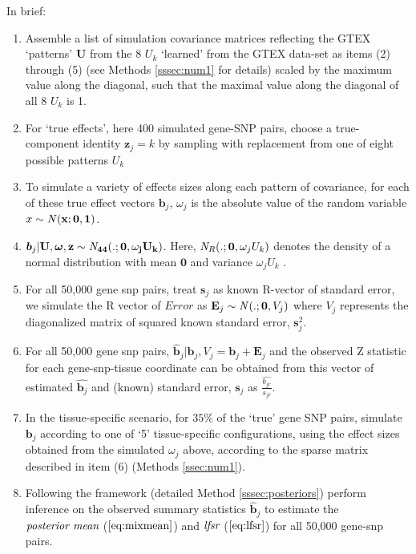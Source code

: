 In brief:
\begin{enumerate}
\item Assemble a list of simulation covariance matrices reflecting the GTEX `patterns' $\bm{U}$ from the 8 $U_{k}$ `learned' from the GTEX data-set as items (2) through (5) (see Methods \ref{sssec:num1} for details)  scaled by the maximum value along the diagonal, such that the maximal value along the diagonal of all 8 $U_{k}$ is 1.
\item For `true effects', here 400 simulated gene-SNP pairs, choose a true-component identity $\bm{z}_{j}=k$ by sampling with replacement from one of eight possible patterns $U_{k}$ 
\item To simulate a variety of effects sizes along each pattern of covariance, for each of these true effect vectors $\bm{b}_{j}$, $\omega_{j}$ is the absolute value of  the random variable $x \sim {\it N}(\bf{x}; \bm{0}, 1)$.
\item $ \bm{b}_{j}  | \bf{U}, \bm{\omega}, \bm{z} \sim{\it N}_{44} (.; \bm{0}, \omega_j U_{k})$. Here, ${\it N}_R(.; \bm{0}, \omega_j U_{k})$ denotes the density of a normal distribution with mean $\bm{0}$ and variance $\omega_j U_{k}$ .

\item For all 50,000 gene snp pairs, treat $\bm{s}_{j}$ as known R-vector of standard error, we simulate the R vector of $Error$ as $\textbf{E}_{j} \sim {\it N} (.; \bm{0}, V_{j} )$ where $V_{j} $ represents the diagonalized matrix of squared known standard error, $\bm{s}_{j}^{2}$. 
\item For all 50,000 gene snp pairs, $\hat{\bm{b}}_{j} | \bm{b}_{j} , V_{j} = \bm{b}_{j} + \textbf{E}_{j}$ %
and the observed Z statistic for each gene-snp-tissue coordinate can be obtained from this vector of estimated $\hat{\bm{b}_{j}}$ and (known) standard error, $\textbf{s}_{j}$ as $\frac{\hat{{b}_{jr}}}{s_{jr}}$.
\item In the tissue-specific scenario, for $35\%$ of the `true' gene SNP pairs, simulate $\bm{b}_{j}$ according to one of `5' tissue-specific configurations, using the effect sizes obtained from the simulated $\omega_{j}$ above, according to the sparse matrix described in item (6) (Methods \ref{ssec:num1}). 
\item Following the framework (detailed Method \ref {sssec:posteriors}) perform inference on the observed summary statistics $\hat{\bm{b}}_{j}$ to estimate the $\emph{posterior mean}$ ($\ref{eq:mixmean}$) and $\emph{lfsr}$ ($\ref{eq:lfsr}$) for all 50,000 gene-snp pairs. 
\end{enumerate}

